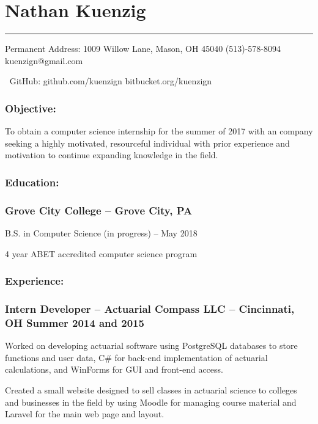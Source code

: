 \documentclass[12pt]{article}
\begin{document}
{
	\centering\section*{\color{head}Nathan Kuenzig}
	\vspace{-7mm}
	\noindent\color{head2}\rule{\textwidth}{1pt}
		
	{\footnotesize {\color{accent}Permanent Address:} 1009 Willow Lane, Mason, OH 45040  (513)-578-8094  kuenzign@gmail.com
			
		{\color{accent}\faGithub $\:$ GitHub:} github.com/kuenzign  bitbucket.org/kuenzign}
	
}
\vspace{-5mm}
\subsubsection*{\color{head}Objective:}
\small To obtain a computer science internship for the summer of 2017 with an company seeking a highly motivated, resourceful individual with prior experience and motivation to continue expanding knowledge in the field.

\subsubsection*{\color{head}Education:}
\subsubsection*{\textnormal{{\color{accent} Grove City College }\color{head} -- Grove City, PA}}
\vspace{-2mm}
\noindent\hspace{2.25pc} B.S. in Computer Science (in progress) -- May 2018

\noindent\hspace{2.25pc} 4 year ABET accredited computer science program

\subsubsection*{\color{head}Experience:}
\subsubsection*{\textnormal{{\color{accent} Intern Developer }\color{head} -- Actuarial Compass LLC -- Cincinnati, OH	\hfill Summer 2014 and 2015}}
\vspace{-2mm}
\begin{compactitem}
	\item Worked on developing actuarial software using PostgreSQL databases to store functions and user data, C\# for back-end implementation of actuarial calculations, and WinForms for GUI and front-end access.
	\item Created a small website designed to sell classes in actuarial science to colleges and businesses in the field by using Moodle for managing course material and Laravel for the main web page and layout.
\end{compactitem}
\vspace{-4.5mm}
\end{document}
